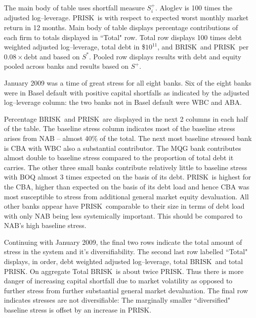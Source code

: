 \documentclass[authoryear]{elsarticle}
\newcommand{\br}{\ensuremath{\mathrm{BRISK}}}
\newcommand{\pr}{\ensuremath{\mathrm{PRISK}}}
\begin{document}
\begin{table}[ht]
\begin{threeparttable}
\begin{tabular}{l|rrrr|rrrr}
\end{tabular}
\begin{tablenotes}
\item[]The main body of table uses shortfall measure $S_i^+$. Aloglev is 100 times the adjusted log--leverage. \pr\  is with respect to expected worst monthly market return  in 12 months.  Main body of table displays percentage contributions of each firm to totals displayed in ``Total" row.   Total row displays 100 times debt weighted adjusted log--leverage, total debt in \$$10^{11}$, and \br\  and \pr\  per $0.08\times$debt and based on $S^*$.  Pooled row displays results with debt and equity pooled across banks and results based on $S^+$. 
\end{tablenotes}
\end{threeparttable}
\end{table}
\normalsize

January 2009 was a time of great stress for all eight banks.       Six of the eight banks were in Basel default with positive capital shortfalls as indicated by the adjusted log--leverage column:   the two banks not in Basel default were WBC and ABA.    
 
 Percentage \br\  and \pr\  are displayed in the next 2 columns in each half of the table.    The baseline stress column indicates most of the baseline stress arises from NAB -- almost 40\% of the total.   The next most baseline stressed bank is CBA with WBC also a substantial contributor.   The MQG bank contributes almost double to baseline stress compared to the proportion of total debt  it carries.  The other three small banks contribute relatively little to baseline stress with BOQ  almost 3 times expected on the basis of its debt.   \pr\   is highest for the CBA, higher than expected on the basis of its debt load and hence CBA was most susceptible to stress from additional general market equity devaluation.    All other banks appear have \pr\ comparable to their size in terms of debt load with only NAB being less systemically important.    This should be compared to NAB's high baseline stress.

Continuing with January 2009, the final two rows indicate the total amount of stress in the system and it's diversifiability.    
The second last  row labelled ``Total"  displays, in order, debt weighted adjusted log--leverage, total \br\  and total \pr.  On aggregate Total \br\  is about twice \pr.   Thus there is more danger of increasing capital shortfall due to market volatility  as opposed to further stress from further substantial general market devaluation.  The final row indicates stresses are not diversifiable:    The marginally  smaller  ``diversified"  baseline stress is offset by an increase in \pr.   
\end{document}
